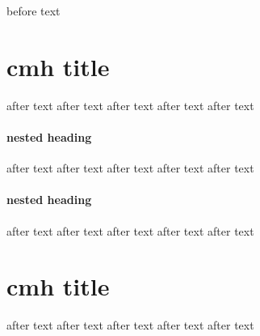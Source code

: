 before text

\section{cmh title}
	after text
	after text
	after text
	after text
	after text
	
	\paragraph{nested heading}
		after text
		after text
		after text
		after text
		after text
		
	\paragraph{nested heading}
		after text
		after text
		after text
		after text
		after text
		
\section{cmh title}
	after text
	after text
	after text
	after text
	after text
